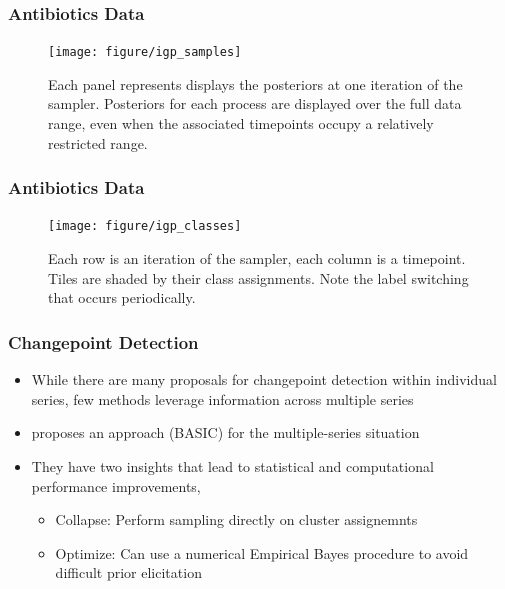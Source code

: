 \documentclass{beamer}
\begin{document}
\begin{frame}
  \frametitle{Antibiotics Data}
\begin{figure}[ht]
  \centering
  \texttt{[image: figure/igp\_samples]}
  \caption{Each panel represents displays the posteriors at one
    iteration of the sampler. Posteriors for each process are displayed over the
    full data range, even when the associated timepoints occupy a relatively
    restricted range. \label{fig:igp_samples}}
\end{figure}

\begin{frame}
  \frametitle{Antibiotics Data}
\begin{figure}[ht]
  \centering
  \texttt{[image: figure/igp\_classes]}
  \caption{Each row is an iteration of the sampler, each column is a timepoint.
    Tiles are shaded by their class assignments. Note the label switching that
    occurs periodically. \label{fig:igp_classes} }
\end{figure}

\end{frame}

\begin{frame}
  \frametitle{Changepoint Detection}
  \begin{itemize}
  \item While there are many proposals for changepoint detection within
    individual series, few methods leverage information across multiple series
  \item \citep{fan2015empirical} proposes an approach (BASIC) for the
    multiple-series situation
  \item They have two insights that lead to statistical and computational
    performance improvements,
    \begin{itemize}
    \item Collapse: Perform sampling directly on cluster assignemnts
    \item Optimize: Can use a numerical Empirical Bayes procedure to avoid
      difficult prior elicitation
    \end{itemize}
  \end{itemize}
\end{frame}


\end{frame}
\end{document}
